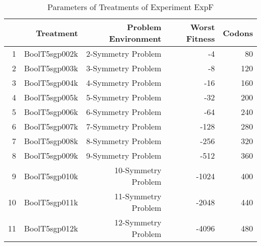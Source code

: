 \begin{table}[ht]
\centering
\begin{tabular}{rrrrr}
  \hline
 & Treatment & Problem Environment & Worst Fitness & Codons \\ 
  \hline
1 & BoolT5sgp002k & 2-Symmetry Problem &    -4 &  80 \\ 
  2 & BoolT5sgp003k & 3-Symmetry Problem &    -8 & 120 \\ 
  3 & BoolT5sgp004k & 4-Symmetry Problem &   -16 & 160 \\ 
  4 & BoolT5sgp005k & 5-Symmetry Problem &   -32 & 200 \\ 
  5 & BoolT5sgp006k & 6-Symmetry Problem &   -64 & 240 \\ 
  6 & BoolT5sgp007k & 7-Symmetry Problem &  -128 & 280 \\ 
  7 & BoolT5sgp008k & 8-Symmetry Problem &  -256 & 320 \\ 
  8 & BoolT5sgp009k & 9-Symmetry Problem &  -512 & 360 \\ 
  9 & BoolT5sgp010k & 10-Symmetry Problem & -1024 & 400 \\ 
  10 & BoolT5sgp011k & 11-Symmetry Problem & -2048 & 440 \\ 
  11 & BoolT5sgp012k & 12-Symmetry Problem & -4096 & 480 \\ 
   \hline
\end{tabular}
\caption{Parameters of Treatments of Experiment ExpF} 
\end{table}
